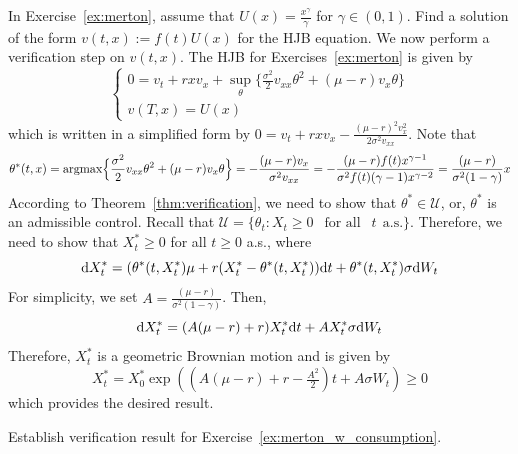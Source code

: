 \documentclass[11pt]{book}
\newcommand{\dd}{\text{\normalfont d}}
\newcommand{\dt}{\text{\normalfont d}t}
\newcommand{\dW}{\text{\normalfont d}W}
\begin{document}
\begin{eg}
    In Exercise~\ref{ex:merton}, assume that $U(x)=\frac{x^\gamma}{\gamma}$ for $\gamma\in(0,1)$. Find a solution of the form $v(t,x):=f(t)U(x)$ for the HJB equation. We now perform a verification step on $v(t,x)$. The HJB for Exercises~\ref{ex:merton} is given by
        \begin{equation}
        \begin{cases}
            0={v}_{t} + rx v_{x} + \sup_{\theta}\Big\{
            \frac{\sigma^2}{2}v_{xx}\theta^2 +(\mu-r)  v_{x}\theta\Big\}\\
            v(T,x)=U(x)
        \end{cases}
    \end{equation}
    which is written in a simplified form by
    $0={v}_{t} + rx v_{x}-\frac{(\mu-r)^2 v_{x}^2}{2\sigma^2v_{xx}}$. %
    Note that 
    \[
    \theta^*(t,x)=\text{\normalfont argmax}\Big\{
            \frac{\sigma^2}{2}v_{xx}\theta^2 +(\mu-r)  v_{x}\theta\Big\}=-\frac{(\mu-r)v_{x}}{\sigma^2 v_{xx}}=-\frac{(\mu-r)f(t) x^{\gamma-1}}{\sigma^2f(t)(\gamma-1)x^{\gamma-2}}=\frac{(\mu-r)}{\sigma^2(1-\gamma)}x
    \]
    According to Theorem~\ref{thm:verification}, we need to show that $\theta^*\in\mathcal{U}$, or, $\theta^*$ is an admissible control. Recall that $\mathcal{U}=\{\theta_t:X_t\ge0~~\text{ for all }~~t~~\text{a.s.}\}$. Therefore, we need to show that $X^*_t\ge0$ for all $t\ge0$ a.s., where
    \[
    \dd X^*_t = (\theta^*(t,X^*_t) \mu + r(X^*_t-\theta^*(t,X^*_t))\dt + \theta^*(t,X^*_t) \sigma \dW_t
    \]
    For simplicity, we set $A=\frac{(\mu-r)}{\sigma^2(1-\gamma)}$. Then, 
    \[
    \dd X^*_t = (A(\mu-r)   + r)X^*_t\dt + A X^*_t\sigma \dW_t
    \]
    Therefore, $X^*_t$ is a geometric Brownian motion and is given by
    \[
    X^*_t=X^*_0\exp\left(\left(A(\mu-r)   + r - \tfrac{A^2}{2}\right) t + A\sigma W_t \right)\ge0
    \]
    which provides the desired result.
\end{eg}
\begin{ex}
    Establish verification result for Exercise~\ref{ex:merton_w_consumption}.
\end{ex}
\end{document}
